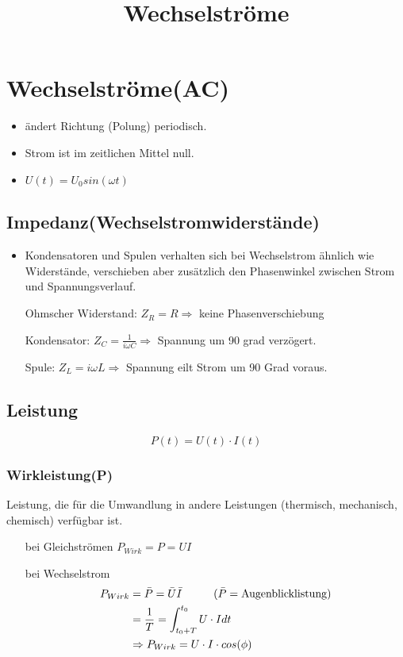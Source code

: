 \documentclass[10pt,a4paper]{article}
\title{Wechselströme}
\begin{document}
\section*{Wechselströme(AC)}
\begin{itemize}
\item ändert Richtung (Polung) periodisch.
\item Strom ist im zeitlichen Mittel null.
\item $U(t)=U_0 sin(\omega t)$
\end{itemize}
\subsection{Impedanz(Wechselstromwiderstände)}
\begin{itemize}
\item Kondensatoren und Spulen verhalten sich bei Wechselstrom ähnlich wie Widerstände, verschieben aber zusätzlich den Phasenwinkel zwischen Strom und Spannungsverlauf.
\item[Ohmscher Widerstand:] $Z_R=R \Rightarrow$ keine Phasenverschiebung
\item[Kondensator:] $Z_C=\frac{1}{i\omega C} \Rightarrow$ Spannung um 90 grad verzögert.
\item[Spule:] $Z_L=i\omega L \Rightarrow$ Spannung eilt Strom um 90 Grad voraus.
\end{itemize}
\subsection{Leistung}
\begin{equation}
P(t)=U(t)\cdot I(t)
\end{equation}
\subsubsection{Wirkleistung(P)}
Leistung, die für die Umwandlung in andere Leistungen (thermisch, mechanisch, chemisch) verfügbar ist. 
\begin{itemize}
\item[bei Gleichströmen] $P_{Wirk}=P=UI $
\item[bei Wechselstrom]
\begin{align}
P_{Wirk}&=\bar{P}=\bar{U}\bar{I} \hspace{1,0cm} (\bar{P}=\text{Augenblicklistung)} \notag \\
&= \frac{1}{T}=\int^{t_0}_{t_0+T}{U\cdot I dt} \notag \\
&\Rightarrow P_{Wirk}=U \cdot I \cdot cos(\phi) 
\end{align} 
\end{itemize}
\end{document}
